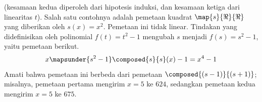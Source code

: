 \begin{exercises}
\begin{answer}
\begin{exparts}
           (kesamaan kedua diperoleh dari hipotesis induksi, dan
           kesamaan ketiga dari linearitas \( t \)).
         \partsitem Salah satu contohnya adalah pemetaan kuadrat
            $\map{s}{\Re}{\Re}$ yang diberikan oleh $s(x)=x^2$.
            Pemetaan ini tidak linear.
            Tindakan yang didefinisikan oleh polinomial $f(t)=t^2-1$
            mengubah $s$ menjadi $f(s)=s^2-1$, yaitu pemetaan berikut.
            \begin{equation*} 
              x\mapsunder{s^2-1} \composed{s}{s}(x)-1=x^4-1
            \end{equation*}
            Amati bahwa pemetaan ini berbeda dari pemetaan
            $\composed{(s-1)}{(s+1)}$; misalnya, pemetaan pertama mengirim
            $x=5$ ke $624$, sedangkan pemetaan kedua mengirim $x=5$ ke $675$.
       \end{exparts} 
     \end{answer}

\end{exercises}
